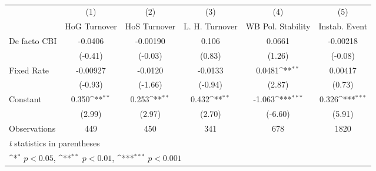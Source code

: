 \begin{table}[htbp]\centering
\def\sym#1{\ifmmode^{#1}\else\(^{#1}\)\fi}
\caption{\label{nondemocraciesFEDF}}
\begin{tabular}{l*{5}{c}}
\toprule
                                        &\multicolumn{1}{c}{(1)}&\multicolumn{1}{c}{(2)}&\multicolumn{1}{c}{(3)}&\multicolumn{1}{c}{(4)}&\multicolumn{1}{c}{(5)}\\
                                        &\multicolumn{1}{c}{HoG Turnover}&\multicolumn{1}{c}{HoS Turnover}&\multicolumn{1}{c}{L. H. Turnover}&\multicolumn{1}{c}{WB Pol. Stability}&\multicolumn{1}{c}{Instab. Event}\\
\midrule
De facto CBI                            &  -0.0406         & -0.00190         &    0.106         &   0.0661         & -0.00218         \\
                                        &  (-0.41)         &  (-0.03)         &   (0.83)         &   (1.26)         &  (-0.08)         \\
\addlinespace
Fixed Rate                              & -0.00927         &  -0.0120         &  -0.0133         &   0.0481\sym{**} &  0.00417         \\
                                        &  (-0.93)         &  (-1.66)         &  (-0.94)         &   (2.87)         &   (0.73)         \\
\addlinespace
Constant                                &    0.350\sym{**} &    0.253\sym{**} &    0.432\sym{**} &   -1.063\sym{***}&    0.326\sym{***}\\
                                        &   (2.99)         &   (2.97)         &   (2.70)         &  (-6.60)         &   (5.91)         \\
\midrule
Observations                            &      449         &      450         &      341         &      678         &     1820         \\
\bottomrule
\multicolumn{6}{l}{\footnotesize \textit{t} statistics in parentheses}\\
\multicolumn{6}{l}{\footnotesize \sym{*} \(p<0.05\), \sym{**} \(p<0.01\), \sym{***} \(p<0.001\)}\\
\end{tabular}
\end{table}
